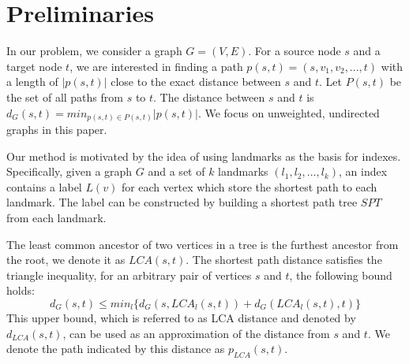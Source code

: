 \section{Preliminaries}
\label{preliminary}

In our problem, we consider a graph $G = (V,E)$. For a source node $s$ and a target node $t$, we are interested in finding a path $p(s,t)=(s,v_1,v_2,...,t)$ with a length of $|p(s,t)|$ close to the exact distance between $s$ and $t$. Let $P(s,t)$ be the set of all paths from $s$ to $t$. The distance between $s$ and $t$ is $d_G(s,t) = min_{p(s,t) \in P(s,t)}|p(s,t)|$. We focus on unweighted, undirected graphs in this paper.


Our method is motivated by the idea of using landmarks as the basis for indexes. Specifically, given a graph $G$ and a set of $k$ landmarks $(l_1,l_2,...,l_k)$, an index contains a label $L(v)$ for each vertex which store the shortest path to each landmark. The label can be constructed by building a shortest path tree $SPT$ from each landmark.


The least common ancestor of two vertices in a tree is the furthest ancestor from the root, we denote it as $LCA(s,t)$. The shortest path distance satisfies the triangle inequality, for an arbitrary pair of vertices $s$ and $t$, the following bound holds:
\begin{equation}
\label{equ:upper}
    d_G(s,t) \leq min_{l}\{d_G(s,LCA_{l}(s,t)) + d_G(LCA_{l}(s,t),t)\}
\end{equation}
This upper bound, which is referred to as LCA distance and denoted by $d_{LCA}(s,t)$, can be used as an approximation of the distance from $s$ and $t$. We denote the path indicated by this distance as $p_{LCA}(s,t)$.